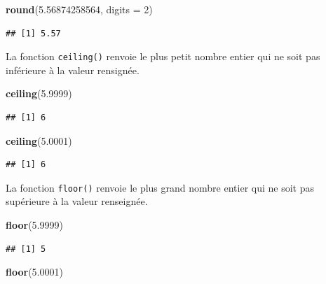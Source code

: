 \documentclass[]{book}
\newenvironment{Shaded}{\begin{snugshade}}{\end{snugshade}}
\newcommand{\DataTypeTok}[1]{\textcolor[rgb]{0.13,0.29,0.53}{#1}}
\newcommand{\DecValTok}[1]{\textcolor[rgb]{0.00,0.00,0.81}{#1}}
\newcommand{\FloatTok}[1]{\textcolor[rgb]{0.00,0.00,0.81}{#1}}
\newcommand{\KeywordTok}[1]{\textcolor[rgb]{0.13,0.29,0.53}{\textbf{#1}}}
\newcommand{\NormalTok}[1]{#1}
\begin{document}
\begin{Shaded}
\begin{Highlighting}[]
\KeywordTok{round}\NormalTok{(}\FloatTok{5.56874258564}\NormalTok{, }\DataTypeTok{digits =} \DecValTok{2}\NormalTok{)}
\end{Highlighting}
\end{Shaded}

\begin{verbatim}
## [1] 5.57
\end{verbatim}

La fonction \texttt{ceiling()} renvoie le plus petit nombre entier qui ne soit pas inférieure à la valeur rensignée.

\begin{Shaded}
\begin{Highlighting}[]
\KeywordTok{ceiling}\NormalTok{(}\FloatTok{5.9999}\NormalTok{)}
\end{Highlighting}
\end{Shaded}

\begin{verbatim}
## [1] 6
\end{verbatim}

\begin{Shaded}
\begin{Highlighting}[]
\KeywordTok{ceiling}\NormalTok{(}\FloatTok{5.0001}\NormalTok{)}
\end{Highlighting}
\end{Shaded}

\begin{verbatim}
## [1] 6
\end{verbatim}

La fonction \texttt{floor()} renvoie le plus grand nombre entier qui ne soit pas supérieure à la valeur renseignée.

\begin{Shaded}
\begin{Highlighting}[]
\KeywordTok{floor}\NormalTok{(}\FloatTok{5.9999}\NormalTok{)}
\end{Highlighting}
\end{Shaded}

\begin{verbatim}
## [1] 5
\end{verbatim}

\begin{Shaded}
\begin{Highlighting}[]
\KeywordTok{floor}\NormalTok{(}\FloatTok{5.0001}\NormalTok{)}
\end{Highlighting}
\end{Shaded}
\end{document}
